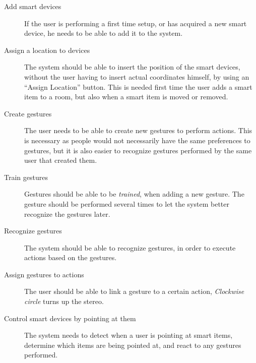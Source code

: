 \begin{description}
    \item[Add smart devices] If the user is performing a first time setup, or has acquired a new smart device, he needs to be able to add it to the system. 
    \item[Assign a location to devices] The system should be able to insert the position of the smart devices, without the user having to insert actual coordinates himself, \eg by using an ``Assign Location'' button. This is needed first time the user adds a smart item to a room, but also when a smart item is moved or removed.
    \item[Create gestures] The user needs to be able to create new gestures to perform actions. This is necessary as people would not necessarily have the same preferences to gestures, but it is also easier to recognize gestures performed by the same user that created them.
    \item[Train gestures] Gestures should be able to be \emph{trained}, \ie when adding a new gesture. The gesture should be performed several times to let the system better recognize the gestures later.  
    \item[Recognize gestures] The system should be able to recognize gestures, in order to execute actions based on the gestures.
    \item[Assign gestures to actions] The user should be able to link a gesture to a certain action, \eg \textit{Clockwise circle} turns up the stereo.
    \item[Control smart devices by pointing at them] The system needs to detect when a user is pointing at smart items, determine which items are being pointed at, and react to any gestures performed.
\end{description}

